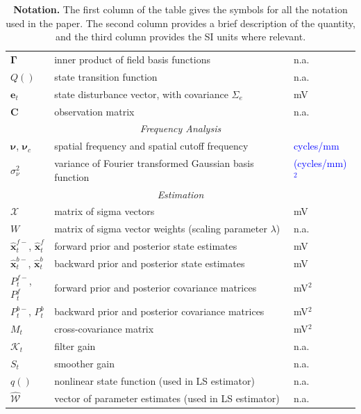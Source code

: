 \documentclass[review,authoryear,3p]{elsarticle}
\newcommand{\parham}[1]{\textcolor{blue}{#1}}
\begin{document}
\begin{table}[!ht]
\begin{tabular}{|l|l|l|}
   	$\boldsymbol{\Gamma}$ & inner product of field basis functions & n.a.\\
   	$Q()$ & state transition function & n.a.\\
   	$\mathbf{e}_t$ & state disturbance vector, with covariance $\Sigma_e$ & mV\\
   	$\mathbf{C}$ & observation matrix & n.a. \\
	\hline
	\multicolumn{3}{|c|}{\emph{Frequency Analysis}} \\
	\hline
	$\boldsymbol{\nu}$, $\boldsymbol{\nu}_c$ & spatial frequency and spatial cutoff frequency & \parham{cycles/mm} \\
	$\sigma_{\nu}^2$ & variance of Fourier transformed Gaussian basis function & \parham{(cycles/mm)$^2$}\\
	\hline
	\multicolumn{3}{|c|}{\emph{Estimation}} \\
	\hline
	$\mathcal{X}$ & matrix of sigma vectors & mV\\
	$W$ & matrix of sigma vector weights (scaling parameter $\lambda$) & n.a.\\
   	$\hat{\mathbf{x}}_t^{f-}$, $\hat{\mathbf{x}}_t^f$ & forward prior and posterior state estimates & mV\\
   	$\hat{\mathbf{x}}_t^{b-}$, $\hat{\mathbf{x}}_t^{b}$ & backward prior and posterior state estimates & mV\\
 	$P^{f-}_t$, $P^f_t$  & forward prior and posterior covariance matrices & mV$^2$\\
   	$P^{b-}_t$, $P^b_t$ & backward prior and posterior covariance matrices & mV$^2$\\
	$M_t$& cross-covariance matrix & mV$^2$\\
	$\mathcal K_{t} $ & filter gain & n.a.\\
	$S_t$ & smoother gain & n.a.\\
	$q()$ & nonlinear state function (used in LS estimator) & n.a.\\
   	$\mathcal{\hat{W}}$& vector of parameter estimates (used in LS estimator) & n.a.\\	
	\hline
\end{tabular}
\caption{\textbf{Notation.} The first column of the table gives the symbols for all the notation used in the paper. The second column provides a brief description of the quantity, and the third column provides the SI units where relevant.}
\label{tab:Notation}
\end{table}
\clearpage
\newpage
\renewcommand{\arraystretch}{1.7}
\end{document}
